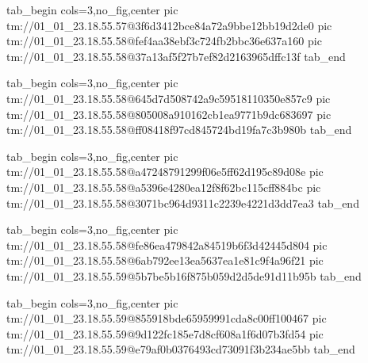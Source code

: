  
 
 
 
 

\qqSecCmtScr


\ifcmt
  tab_begin cols=3,no_fig,center
    pic tm://01_01_23.18.55.57@3f6d3412bce84a72a9bbe12bb19d2de0
    pic tm://01_01_23.18.55.58@fef4aa38ebf3c724fb2bbc36e637a160
    pic tm://01_01_23.18.55.58@37a13af5f27b7ef82d2163965dffc13f
  tab_end
\fi


\ifcmt
  tab_begin cols=3,no_fig,center
    pic tm://01_01_23.18.55.58@645d7d508742a9c59518110350e857c9
    pic tm://01_01_23.18.55.58@805008a910162cb1ea9771b9dc683697
    pic tm://01_01_23.18.55.58@ff08418f97cd845724bd19fa7c3b980b
  tab_end
\fi


\ifcmt
  tab_begin cols=3,no_fig,center
    pic tm://01_01_23.18.55.58@a47248791299f06e5ff62d195c89d08e
    pic tm://01_01_23.18.55.58@a5396e4280ea12f8f62bc115cff884bc
    pic tm://01_01_23.18.55.58@3071bc964d9311c2239e4221d3dd7ea3
  tab_end
\fi


\ifcmt
  tab_begin cols=3,no_fig,center
    pic tm://01_01_23.18.55.58@fe86ea479842a84519b6f3d42445d804
    pic tm://01_01_23.18.55.58@6ab792ee13ea5637ea1e81c9f4a96f21
    pic tm://01_01_23.18.55.59@5b7be5b16f875b059d2d5de91d11b95b
  tab_end
\fi


\ifcmt
  tab_begin cols=3,no_fig,center
    pic tm://01_01_23.18.55.59@855918bde65959991cda8c00ff100467
    pic tm://01_01_23.18.55.59@9d122fc185e7d8cf608a1f6d07b3fd54
    pic tm://01_01_23.18.55.59@e79af0b0376493cd73091f3b234ae5bb
  tab_end
\fi

